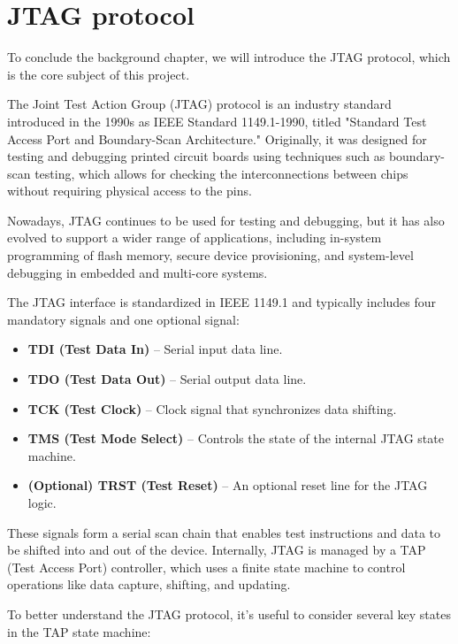 \documentclass[a4paper,11pt,oneside]{report}
\begin{document}
\section{JTAG protocol}

To conclude the background chapter, we will introduce the JTAG protocol, which is the core subject of this project.

The Joint Test Action Group (JTAG) protocol is an industry standard introduced in the 1990s as IEEE Standard 1149.1-1990,
 titled "Standard Test Access Port and Boundary-Scan Architecture."
Originally, it was designed for testing and debugging printed circuit boards using techniques such as boundary-scan testing, 
which allows for checking the interconnections between chips without requiring physical access to the pins.

Nowadays, JTAG continues to be used for testing and debugging, but it has also evolved to support a wider range of applications, 
including in-system programming of flash memory, secure device provisioning, and system-level debugging in embedded and multi-core systems.

The JTAG interface is standardized in IEEE 1149.1 and typically includes four mandatory signals and one optional signal:

\begin{itemize}
\item \textbf{TDI (Test Data In)} – Serial input data line.
\item \textbf{TDO (Test Data Out)} – Serial output data line.
\item \textbf{TCK (Test Clock)} – Clock signal that synchronizes data shifting.
\item \textbf{TMS (Test Mode Select)} – Controls the state of the internal JTAG state machine.
\item \textbf{(Optional) TRST (Test Reset)} – An optional reset line for the JTAG logic.
\end{itemize}

These signals form a serial scan chain that enables test instructions and data to be shifted into and out of the device. 
Internally, JTAG is managed by a TAP (Test Access Port) controller, which uses a finite state machine to control operations like data capture, shifting, and updating.

To better understand the JTAG protocol, it's useful to consider several key states in the TAP state machine:
\end{document}
